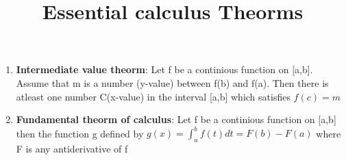 \documentclass[12pt]{article}
\date{}
\begin{document}
\title{Essential calculus Theorms}
\maketitle

\begin{enumerate}
\item \textbf{Intermediate value theorm}:
Let f be a continious function on [a,b]. Assume that m is a number (y-value) between f(b) and f(a).
Then there is atleast one number C(x-value) in the interval [a,b] which satisfies $f(c)=m$

\item \textbf{Fundamental theorm of calculus}:
Let f be a continious function on [a,b] then the function g defined by 
$g(x) = \int_a^bf(t) dt = F(b)- F(a)$ where F is any antiderivative of f
\end{enumerate}
\end{document}
